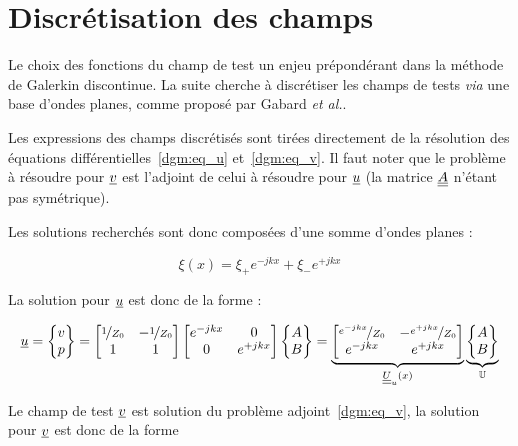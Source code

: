 \section{Discrétisation des champs}

Le choix des fonctions du champ de test un enjeu prépondérant dans la méthode de Galerkin discontinue.
La suite cherche à discrétiser les champs de tests \textit{via} une base d'ondes planes, comme proposé par Gabard
\textit{et al.}\cite{Gabard15}.

Les expressions des champs discrétisés sont tirées directement de la résolution des équations
différentielles~\eqref{dgm:eq_u} et~\eqref{dgm:eq_v}. Il faut noter que le problème à résoudre pour $\underline{v}$ est l'adjoint
de celui à résoudre pour $\underline{u}$ (la matrice $\underline{\underline{A}}$ n'étant pas symétrique).

Les solutions recherchés sont donc composées d'une somme d'ondes planes :

\[
    \xi(x) = \xi_+e^{-jkx}+\xi_-e^{+jkx}
\]

La solution pour $\underline{u}$ est donc de la forme :

\begin{equation}
    \underline{u} = \begin{Bmatrix}v\\p\end{Bmatrix} =
    \begin{bmatrix}
        \nicefrac{1}{Z_0} & -\nicefrac{1}{Z_0}\\
        1 & 1
    \end{bmatrix}
    \begin{bmatrix}
        e^{-jkx} & 0\\
        0 & e^{+jkx}
    \end{bmatrix}
    \begin{Bmatrix}
        A\\B
    \end{Bmatrix}
    =
    \underbrace{\begin{bmatrix}
        \nicefrac{e^{-jkx}}{Z_0} & -\nicefrac{e^{+jkx}}{Z_0}\\
        e^{-jkx} & e^{+jkx}
    \end{bmatrix}}_{\underline{\underline{U}}_u(x)}
    \underbrace{\begin{Bmatrix}
        A\\B
    \end{Bmatrix}}_{\mathbb{U}}
\end{equation}

Le champ de test $\underline{v}$ est solution du problème adjoint~\eqref{dgm:eq_v}, la solution pour $\underline{v}$ est donc de la forme

